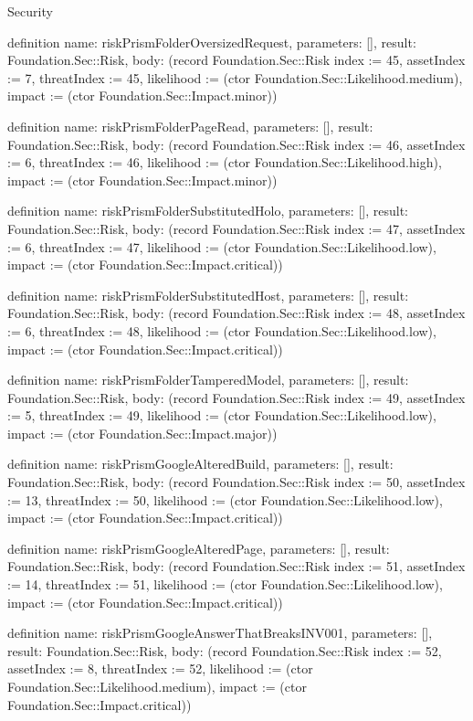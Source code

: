 \begin{lexlean}{Security}
\begin{semanticmodule}
definition{
  name: riskPrismFolderOversizedRequest,
  parameters: [],
  result: Foundation.Sec::Risk,
  body: (record Foundation.Sec::Risk {index := 45, assetIndex := 7, threatIndex := 45, likelihood := (ctor Foundation.Sec::Likelihood.medium), impact := (ctor Foundation.Sec::Impact.minor)})
}

definition{
  name: riskPrismFolderPageRead,
  parameters: [],
  result: Foundation.Sec::Risk,
  body: (record Foundation.Sec::Risk {index := 46, assetIndex := 6, threatIndex := 46, likelihood := (ctor Foundation.Sec::Likelihood.high), impact := (ctor Foundation.Sec::Impact.minor)})
}

definition{
  name: riskPrismFolderSubstitutedHolo,
  parameters: [],
  result: Foundation.Sec::Risk,
  body: (record Foundation.Sec::Risk {index := 47, assetIndex := 6, threatIndex := 47, likelihood := (ctor Foundation.Sec::Likelihood.low), impact := (ctor Foundation.Sec::Impact.critical)})
}

definition{
  name: riskPrismFolderSubstitutedHost,
  parameters: [],
  result: Foundation.Sec::Risk,
  body: (record Foundation.Sec::Risk {index := 48, assetIndex := 6, threatIndex := 48, likelihood := (ctor Foundation.Sec::Likelihood.low), impact := (ctor Foundation.Sec::Impact.critical)})
}

definition{
  name: riskPrismFolderTamperedModel,
  parameters: [],
  result: Foundation.Sec::Risk,
  body: (record Foundation.Sec::Risk {index := 49, assetIndex := 5, threatIndex := 49, likelihood := (ctor Foundation.Sec::Likelihood.low), impact := (ctor Foundation.Sec::Impact.major)})
}

definition{
  name: riskPrismGoogleAlteredBuild,
  parameters: [],
  result: Foundation.Sec::Risk,
  body: (record Foundation.Sec::Risk {index := 50, assetIndex := 13, threatIndex := 50, likelihood := (ctor Foundation.Sec::Likelihood.low), impact := (ctor Foundation.Sec::Impact.critical)})
}

definition{
  name: riskPrismGoogleAlteredPage,
  parameters: [],
  result: Foundation.Sec::Risk,
  body: (record Foundation.Sec::Risk {index := 51, assetIndex := 14, threatIndex := 51, likelihood := (ctor Foundation.Sec::Likelihood.low), impact := (ctor Foundation.Sec::Impact.critical)})
}

definition{
  name: riskPrismGoogleAnswerThatBreaksINV001,
  parameters: [],
  result: Foundation.Sec::Risk,
  body: (record Foundation.Sec::Risk {index := 52, assetIndex := 8, threatIndex := 52, likelihood := (ctor Foundation.Sec::Likelihood.medium), impact := (ctor Foundation.Sec::Impact.critical)})
}


\end{semanticmodule}
\end{lexlean}
